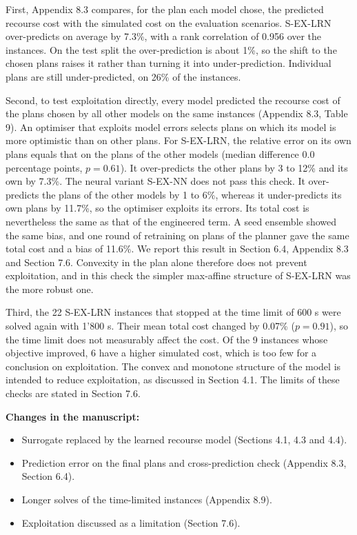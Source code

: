 \documentclass{article}
\newcommand{\changes}{\vspace{0.1cm}\noindent\textbf{Changes in the manuscript:}}
\begin{document}
First, Appendix 8.3 compares, for the plan each model chose, the predicted recourse cost with the simulated cost on the evaluation scenarios. S-EX-LRN over-predicts on average by 7.3\%, with a rank correlation of 0.956 over the instances. On the test split the over-prediction is about 1\%, so the shift to the chosen plans raises it rather than turning it into under-prediction. Individual plans are still under-predicted, on 26\% of the instances.

Second, to test exploitation directly, every model predicted the recourse cost of the plans chosen by all other models on the same instances (Appendix 8.3, Table 9). An optimiser that exploits model errors selects plans on which its model is more optimistic than on other plans. For S-EX-LRN, the relative error on its own plans equals that on the plans of the other models (median difference 0.0 percentage points, $p = 0.61$). It over-predicts the other plans by 3 to 12\% and its own by 7.3\%. The neural variant S-EX-NN does not pass this check. It over-predicts the plans of the other models by 1 to 6\%, whereas it under-predicts its own plans by 11.7\%, so the optimiser exploits its errors. Its total cost is nevertheless the same as that of the engineered term. A seed ensemble showed the same bias, and one round of retraining on plans of the planner gave the same total cost and a bias of \textminus{}11.6\%. We report this result in Section 6.4, Appendix 8.3 and Section 7.6. Convexity in the plan alone therefore does not prevent exploitation, and in this check the simpler max-affine structure of S-EX-LRN was the more robust one.

Third, the 22 S-EX-LRN instances that stopped at the time limit of 600 s were solved again with 1{'}800 s. Their mean total cost changed by \textminus{}0.07\% ($p = 0.91$), so the time limit does not measurably affect the cost. Of the 9 instances whose objective improved, 6 have a higher simulated cost, which is too few for a conclusion on exploitation. The convex and monotone structure of the model is intended to reduce exploitation, as discussed in Section 4.1. The limits of these checks are stated in Section 7.6.

\changes
\begin{itemize}[nosep]
\item Surrogate replaced by the learned recourse model (Sections 4.1, 4.3 and 4.4).
\item Prediction error on the final plans and cross-prediction check (Appendix 8.3, Section 6.4).
\item Longer solves of the time-limited instances (Appendix 8.9).
\item Exploitation discussed as a limitation (Section 7.6).
\end{itemize}
\end{document}
